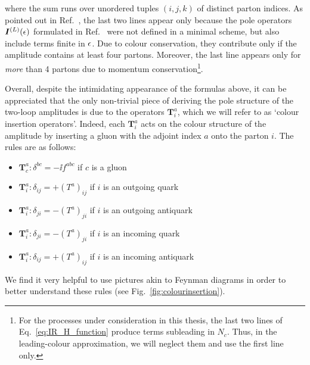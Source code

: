 \documentclass[main.tex]{subfiles}
\begin{document}
where the sum runs over unordered tuples $(i,j,k)$ of distinct parton indices. As pointed out in Ref.~\cite{Becher:2009cu}, the last two lines appear only because the pole operators $\bm{I}^{(L)}(\epsilon)$ formulated in Ref.~\cite{Catani:1998bh} were not defined in a minimal scheme, but also include terms finite in $\epsilon$. Due to colour conservation, they contribute only if the amplitude contains at least four partons. Moreover, the last line appears only for \textit{more} than 4 partons due to momentum conservation\footnote{For the processes under consideration in this thesis, the last two lines of Eq.~\ref{eq:IR_H_function} produce terms subleading in $N_c$. Thus, in the leading-colour approximation, we will neglect them and use the first line only.}.

Overall, despite the intimidating appearance of the formulas above, it can be appreciated that the only non-trivial piece of deriving the pole structure of the two-loop amplitudes is due to the operators $\bm{T}_i^a$, which we will refer to as `colour insertion operators'. Indeed, each $\bm{T}_i^a$ acts on the colour structure of the amplitude by inserting a gluon with the adjoint index $a$ onto the parton $i$. The rules are as follows:
\begin{itemize}
    \item $\bm{T}_c^a: \delta^{bc} = -\ii f^{abc}$ if $c$ is a gluon
    \item $\bm{T}_i^a: \delta_{ij} = + (T^a)_{ij}$ if $i$ is an outgoing quark 
    \item $\bm{T}_i^a: \delta_{ji} = - (T^a)_{ji}$ if $i$ is an outgoing antiquark
    \item $\bm{T}_i^a: \delta_{ji} = - (T^a)_{ji}$ if $i$ is an incoming quark
    \item $\bm{T}_i^a: \delta_{ij} = + (T^a)_{ij}$ if $i$ is an incoming antiquark
\end{itemize}
We find it very helpful to use pictures akin to Feynman diagrams in order to better understand these rules (see  Fig.~\ref{fig:colourinsertion}). 
\end{document}
